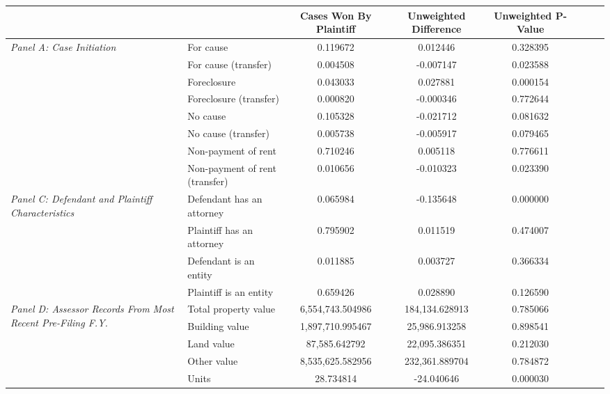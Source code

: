 \begin{tabular}{llcccccc}
\toprule
 &  & Cases Won By Plaintiff & Unweighted Difference & Unweighted P-Value \\
\midrule
\multirow[c]{8}{4cm}{\textit{Panel A: Case Initiation}} & For cause & 0.119672 & 0.012446 & 0.328395 \\
 & For cause (transfer) & 0.004508 & -0.007147 & 0.023588 \\
 & Foreclosure & 0.043033 & 0.027881 & 0.000154 \\
 & Foreclosure (transfer) & 0.000820 & -0.000346 & 0.772644 \\
 & No cause & 0.105328 & -0.021712 & 0.081632 \\
 & No cause (transfer) & 0.005738 & -0.005917 & 0.079465 \\
 & Non-payment of rent & 0.710246 & 0.005118 & 0.776611 \\
 & Non-payment of rent (transfer) & 0.010656 & -0.010323 & 0.023390 \\
\cline{1-5}
\multirow[c]{4}{4cm}{\textit{Panel C: Defendant and Plaintiff Characteristics}} & Defendant has an attorney & 0.065984 & -0.135648 & 0.000000 \\
 & Plaintiff has an attorney & 0.795902 & 0.011519 & 0.474007 \\
 & Defendant is an entity & 0.011885 & 0.003727 & 0.366334 \\
 & Plaintiff is an entity & 0.659426 & 0.028890 & 0.126590 \\
\cline{1-5}
\multirow[c]{5}{4cm}{\textit{Panel D: Assessor Records From Most Recent Pre-Filing F.Y.}} & Total property value & 6,554,743.504986 & 184,134.628913 & 0.785066 \\
 & Building value & 1,897,710.995467 & 25,986.913258 & 0.898541 \\
 & Land value & 87,585.642792 & 22,095.386351 & 0.212030 \\
 & Other value & 8,535,625.582956 & 232,361.889704 & 0.784872 \\
 & Units & 28.734814 & -24.040646 & 0.000030 \\
\cline{1-5}
\bottomrule
\end{tabular}
